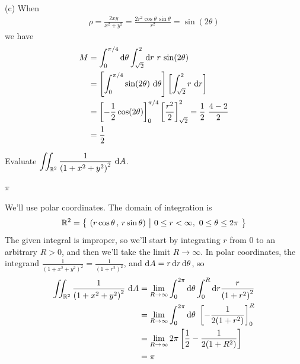 \begin{solution}
(c) When
\begin{align*}
\rho = \frac{2xy}{x^2+y^2} = \frac{2r^2\cos\theta\,\sin\theta}{r^2}
     =\sin(2\theta)
\end{align*}
we have
\begin{align*}
M &= \int_0^{\pi/4}\mathrm{d}\theta\int_{\sqrt{2}}^2\mathrm{d}r\ r\,
          \sin(2\theta) \\
&=\left[\int_0^{\pi/4}\sin(2\theta)\ \mathrm{d}\theta\right]
 \left[\int_{\sqrt{2}}^2 r\ \mathrm{d}r\right] \\
&=\left[-\frac{1}{2}\cos(2\theta)\right]_0^{\pi/4}
 \left[ \frac{r^2}{2}\right]_{\sqrt{2}}^2 
  =\frac{1}{2}\ \frac{4-2}{2} \\
&=\frac{1}{2}
\end{align*}
\end{solution}

\begin{question}[M200 2009A] %
Evaluate $\displaystyle \iint_{\mathbb{R}^2} \frac{1}{{(1+x^2+y^2)}^2}\ \mathrm{d}A$.
\end{question}

%

\begin{answer}
$\pi$
\end{answer}

\begin{solution}
We'll use polar coordinates. The domain of integration is
\begin{equation*}
\bbbr^2=\Set{(r\cos\theta\,,\,r\sin\theta)}{0\le r<\infty,\ 
                       0\le\theta\le 2\pi}
\end{equation*}
The given integral is improper, so we'll start by integrating $r$ from $0$
to an arbitrary $R>0$, and then we'll take the limit $R\rightarrow\infty$.
In polar coordinates, the integrand
$\frac{1}{{(1+x^2+y^2)}^2}=\frac{1}{{(1+r^2)}^2}$, and
 $\mathrm{d}A=r\,\mathrm{d}r\,\mathrm{d}\theta$, so
\begin{align*}
\dblInt_{\bbbr^2} \frac{1}{{(1+x^2+y^2)}^2}\ \dee{A}
&=\lim_{R\rightarrow\infty} \int_0^{2\pi}\dee{\theta}\int_0^R\dee{r}
                  \frac{r}{{(1+r^2)}^2} \\
&=\lim_{R\rightarrow\infty} \int_0^{2\pi}\dee{\theta}\ 
                      \left[-\frac{1}{2(1+r^2)}\right]_0^R \\
&=\lim_{R\rightarrow\infty} 2\pi
                      \left[\frac{1}{2}-\frac{1}{2(1+R^2)}\right] \\
&=\pi
\end{align*}
\end{solution}

